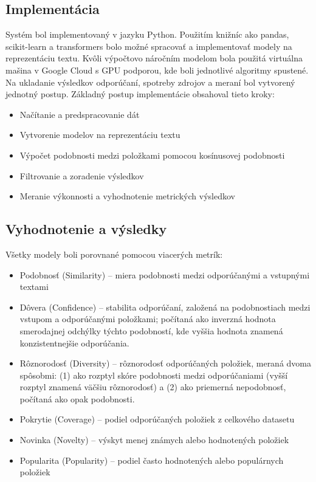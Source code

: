\documentclass[\myFontSize,a4paper,oneside,hidelinks]{article}
\begin{document}
\subsection*{Implementácia}

Systém bol implementovaný v jazyku Python. Použitím knižníc ako pandas, scikit-learn a transformers bolo možné spracovať a implementovať modely na reprezentáciu textu. Kvôli výpočtovo náročním modelom bola použitá virtuálna mašina v Google Cloud s GPU podporou, kde boli jednotlivé algoritmy spustené. Na ukladanie výsledkov odporúčaní, spotreby zdrojov a meraní bol vytvorený jednotný postup.
Základný postup implementácie obsahoval tieto kroky:
\begin{itemize}
\item    Načítanie a predspracovanie dát
\item    Vytvorenie modelov na reprezentáciu textu
\item    Výpočet podobnosti medzi položkami pomocou kosínusovej podobnosti
\item    Filtrovanie a zoradenie výsledkov
\item    Meranie výkonnosti a vyhodnotenie metrických výsledkov
\end{itemize}

\subsection*{Vyhodnotenie a výsledky}

Všetky modely boli porovnané pomocou viacerých metrík:
\begin{itemize}
\item    Podobnosť (Similarity) – miera podobnosti medzi odporúčanými a vstupnými textami
\item    Dôvera (Confidence) – stabilita odporúčaní, založená na podobnostiach medzi vstupom a odporúčanými položkami; počítaná ako inverzná hodnota smerodajnej odchýlky týchto podobností, kde vyššia hodnota znamená konzistentnejšie odporúčania.
\item    Rôznorodosť (Diversity) – rôznorodosť odporúčaných položiek, meraná dvoma spôsobmi: 
(1) ako rozptyl skóre podobnosti medzi odporúčaniami (vyšší rozptyl znamená väčšiu rôznorodosť) 
a (2) ako priemerná nepodobnosť, počítaná ako opak podobnosti.
\item    Pokrytie (Coverage) – podiel odporúčaných položiek z celkového datasetu
\item    Novinka (Novelty) – výskyt menej známych alebo hodnotených položiek
\item    Popularita (Popularity) – podiel často hodnotených alebo populárnych položiek
\end{itemize}
\end{document}
